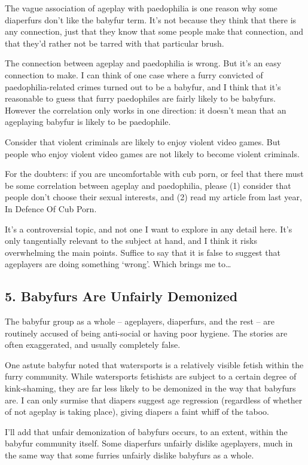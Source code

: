 The vague association of ageplay with paedophilia is one reason why some diaperfurs don't like the babyfur term. It's not because they think that there is any connection, just that they know that some people make that connection, and that they'd rather not be tarred with that particular brush.

The connection between ageplay and paedophilia is wrong. But it's an easy connection to make. I can think of one case where a furry convicted of paedophilia-related crimes turned out to be a babyfur, and I think that it's reasonable to guess that furry paedophiles are fairly likely to be babyfurs. However the correlation only works in one direction: it doesn't mean that an ageplaying babyfur is likely to be paedophile.

Consider that violent criminals are likely to enjoy violent video games. But people who enjoy violent video games are not likely to become violent criminals.

For the doubters: if you are uncomfortable with cub porn, or feel that there must be some correlation between ageplay and paedophilia, please (1) consider that people don't choose their sexual interests, and (2) read my article from last year, In Defence Of Cub Porn.

It's a controversial topic, and not one I want to explore in any detail here. It's only tangentially relevant to the subject at hand, and I think it risks overwhelming the main points. Suffice to say that it is false to suggest that ageplayers are doing something ‘wrong'. Which brings me to…

\subsection*{5. Babyfurs Are Unfairly Demonized}

The babyfur group as a whole -- ageplayers, diaperfurs, and the rest -- are routinely accused of being anti-social or having poor hygiene. The stories are often exaggerated, and usually completely false.

One astute babyfur noted that watersports is a relatively visible fetish within the furry community. While watersports fetishists are subject to a certain degree of kink-shaming, they are far less likely to be demonized in the way that babyfurs are. I can only surmise that diapers suggest age regression (regardless of whether of not ageplay is taking place), giving diapers a faint whiff of the taboo.

I'll add that unfair demonization of babyfurs occurs, to an extent, within the babyfur community itself. Some diaperfurs unfairly dislike ageplayers, much in the same way that some furries unfairly dislike babyfurs as a whole.

